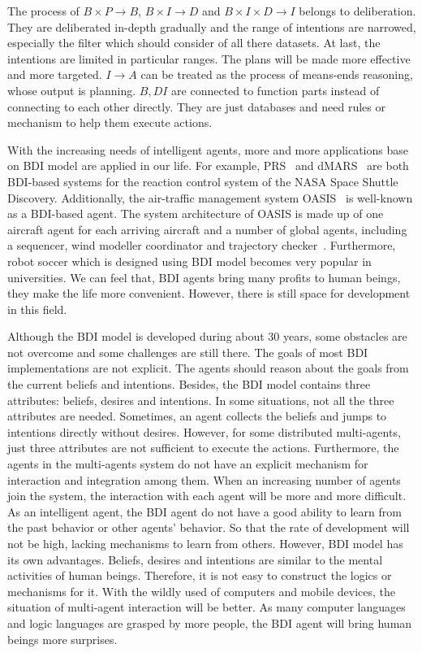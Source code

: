 The process of $B \times P \to B$, $B \times I \to D$ and $B \times I \times D \to I$ belongs to deliberation.
They are deliberated in-depth gradually and the range of intentions are narrowed, especially the filter which should consider of all there datasets.
At last, the intentions are limited in particular ranges.
The plans will be made more effective and more targeted.
$I \to A $ can be treated as the process of means-ends reasoning, whose output is planning.
$B,D I$ are connected to function parts instead of connecting to each other directly.
They are just databases and need rules or mechanism to help them execute actions.

With the increasing needs of intelligent agents, more and more applications base on BDI model are applied in our life.
For example, PRS~\cite{Ingrand_PRS_1992} and dMARS~\cite{Mark_dMARS_2004} are both BDI-based systems for the reaction control system of the NASA Space Shuttle Discovery.
Additionally, the air-traffic management system OASIS~\cite{Magnus_OASIS_1992} is well-known as a BDI-based agent.
The system architecture of OASIS is made up of one aircraft agent for each arriving aircraft and a number of global agents, including a sequencer, wind modeller coordinator and trajectory checker~\cite{Rao_BDITheory_1995}.
Furthermore, robot soccer which is designed using BDI model becomes very popular in universities.
We can feel that, BDI agents bring many profits to human beings, they make the life more convenient.
However, there is still space for development in this field.

Although the BDI model is developed during about 30 years, some obstacles are not overcome and some challenges are still there.
The goals of most BDI implementations are not explicit.
The agents should reason about the goals from the current beliefs and intentions.
Besides, the BDI model contains three attributes: beliefs, desires and intentions.
In some situations, not all the three attributes are needed.
Sometimes, an agent collects the beliefs and jumps to intentions directly without desires.
However, for some distributed multi-agents, just three attributes are not sufficient to execute the actions.
Furthermore, the agents in the multi-agents system do not have an explicit mechanism for interaction and integration among them.
When an increasing number of agents join the system, the interaction with each agent will be more and more difficult.
As an intelligent agent, the BDI agent do not have a good ability to learn from the past behavior or other agents’ behavior.
So that the rate of development will not be high, lacking mechanisms to learn from others.
However, BDI model has its own advantages.
Beliefs, desires and intentions are similar to the mental activities of human beings.
Therefore, it is not easy to construct the logics or mechanisms for it.
With the wildly used of computers and mobile devices, the situation of multi-agent interaction will be better.
As many computer languages and logic languages are grasped by more people, the BDI agent will bring human beings more surprises.


